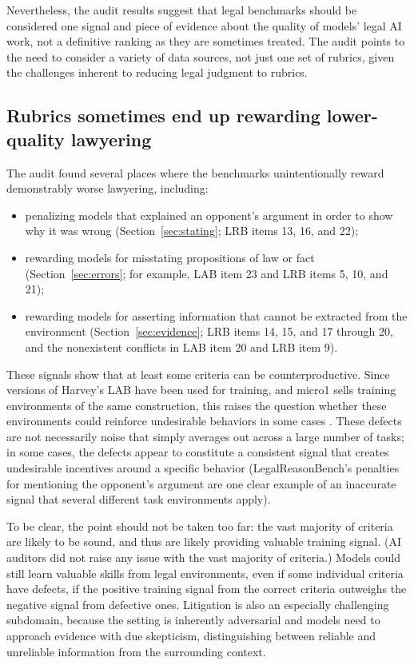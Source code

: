 \documentclass[11pt]{article}
\begin{document}
Nevertheless, the audit results suggest that legal benchmarks should be considered one signal and piece of evidence about the quality of models' legal AI work, not a definitive ranking as they are sometimes treated. The audit points to the need to consider a variety of data sources, not just one set of rubrics, given the challenges inherent to reducing legal judgment to rubrics.

\subsection{Rubrics sometimes end up rewarding lower-quality lawyering}
\label{sec:training}

The audit found several places where the benchmarks unintentionally reward demonstrably worse lawyering, including:
\begin{itemize}
\item penalizing models that explained an opponent's argument in order to show why it was wrong (Section~\ref{sec:stating}; LRB items 13, 16, and 22);
\item rewarding models for misstating propositions of law or fact (Section~\ref{sec:errors}; for example, LAB item 23 and LRB items 5, 10, and 21);
\item rewarding models for asserting information that cannot be extracted from the environment (Section~\ref{sec:evidence}; LRB items 14, 15, and 17 through 20, and the nonexistent conflicts in LAB item 20 and LRB item 9).
\end{itemize}
These signals show that at least some criteria can be counterproductive. Since versions of Harvey's LAB have been used for training, and micro1 sells training environments of the same construction, this raises the question whether these environments could reinforce undesirable behaviors in some cases \citep{harveyTenet,appliedCompute,micro1LRB}. These defects are not necessarily noise that simply averages out across a large number of tasks; in some cases, the defects appear to constitute a consistent signal that creates undesirable incentives around a specific behavior (LegalReasonBench's penalties for mentioning the opponent's argument are one clear example of an inaccurate signal that several different task environments apply).

To be clear, the point should not be taken too far: the vast majority of criteria are likely to be sound, and thus are likely providing valuable training signal. (AI auditors did not raise any issue with the vast majority of criteria.) Models could still learn valuable skills from legal environments, even if some individual criteria have defects, if the positive training signal from the correct criteria outweighs the negative signal from defective ones. Litigation is also an especially challenging subdomain, because the setting is inherently adversarial and models need to approach evidence with due skepticism, distinguishing between reliable and unreliable information from the surrounding context.
\end{document}
